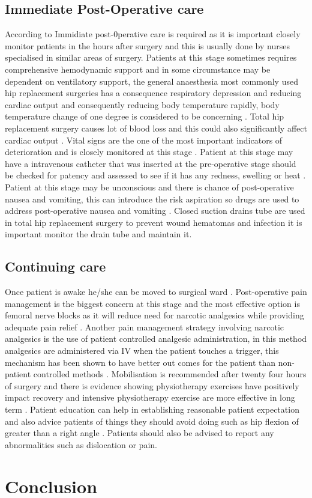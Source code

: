 \documentclass[a4paper,man,british]{apa6}
\let \cite \parencite
\begin{document}
\subsection{Immediate Post-Operative care}
 According to \citeauthor{liddle_principles_2013}  Immidiate post-0perative care is required as it is important closely monitor patients in the hours after surgery and this is usually done by nurses specialised in similar areas of surgery. Patients at this stage sometimes requires comprehensive hemodynamic support and in some circumstance may be dependent on ventilatory support, the general anaesthesia most commonly used hip replacement surgeries has a consequence respiratory depression and reducing cardiac output and  consequently reducing body temperature rapidly, body temperature change of one degree is considered to be concerning \parencite{BojarRobertM.2010EPC}. Total hip replacement surgery causes lot of blood loss and this could also significantly affect cardiac output \cite{mcconnell_reduction_2011}.
 Vital signs are the one of the most important indicators of deterioration and is closely monitored at this stage \citeauthor{liddle_principles_2013}.
 Patient at this stage may have a intravenous catheter that was inserted at the pre-operative stage should be checked for patency and assessed to see if it has any redness, swelling or heat \citeauthor{liddle_principles_2013}. Patient at this stage may be unconscious and there is chance of post-operative nausea and vomiting, this can introduce the risk aspiration so drugs are used to address post-operative nausea and vomiting \cite{nanavati_fast-track_2014}.
 Closed suction drains tube are used in total hip replacement surgery to prevent wound hematomas and infection\cite{parker_closed_2004} it is important monitor the drain tube and maintain it. 

\subsection{Continuing care}

Once patient is awake he/she can be moved to surgical ward \citeauthor{nanavati_fast-track_2014}. Post-operative pain management is the biggest concern at this stage and the most effective option is femoral nerve blocks as it will reduce need for narcotic analgesics while providing adequate pain relief \cite{ranawat_pain_2007,ward_are_2012}.
Another pain management strategy involving narcotic analgesics is the use of patient controlled analgesic administration, in this method analgesics are administered via IV when the patient touches a trigger, this mechanism has been shown to have better out comes for the patient than non-patient controlled methods  \cite{mcnicol_patient_2015}. 
Mobilisation is recommended  after twenty four hours of surgery and there is evidence showing physiotherapy exercises have positively impact recovery and intensive physiotherapy exercise are more effective in long term \cite{bandholm_physiotherapy_2012}.
Patient education can help in establishing reasonable patient expectation and also advice patients of things they should avoid doing such as hip flexion of greater than a right angle \cite{keating_manipulation_2007}. Patients should also be advised to report any abnormalities such as dislocation or pain.

\newpage
\section{Conclusion}%



\printbibliography
\end{document}

